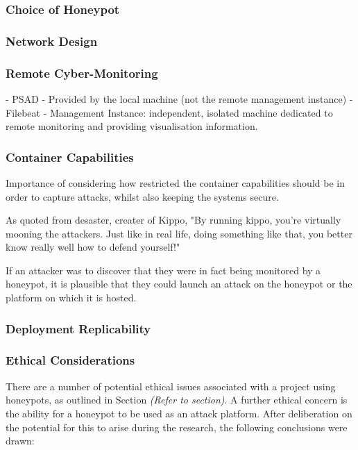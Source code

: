 		\subsubsection{Choice of Honeypot}
				
		\subsubsection{Network Design}
		\subsubsection{Remote Cyber-Monitoring}
		- PSAD
			- Provided by the local machine (not the remote management instance)
		- Filebeat
		- Management Instance: independent, isolated machine dedicated to remote monitoring and providing visualisation information.

		\subsubsection{Container Capabilities}
		Importance of considering how restricted the container capabilities should be in order to capture attacks, whilst also keeping the systems secure.
		
		As quoted from desaster, creater of Kippo, "By running kippo, you're virtually mooning the attackers. Just like in real life, doing something like that, you better know really well how to defend yourself!"
		
		If an attacker was to discover that they were in fact being monitored by a honeypot, it is plausible that they could launch an attack on the honeypot or the platform on which it is hosted.

		\subsubsection{Deployment Replicability}
		
		\subsubsection{Ethical Considerations}
		There are a number of potential ethical issues associated with a project using honeypots, as outlined in Section \textit{(Refer to section)}. A further ethical concern is the ability for a honeypot to be used as an attack platform. After deliberation on the potential for this to arise during the research, the following conclusions were drawn: 	
		
